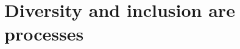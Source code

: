 \documentclass[10pt,letterpaper]{article}
\begin{document}


\section{Diversity and inclusion are processes}
\label{rule_process}

\end{document}
